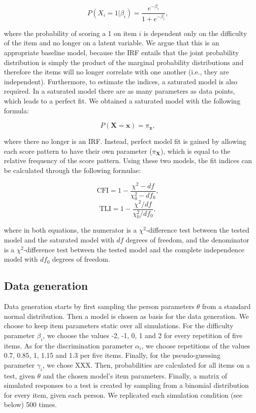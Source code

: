 \documentclass[Royal,sageapa,times,doublespace]{sagej}
\begin{document}
\begin{equation}
P(X_i = 1 | \beta_{i}) = \frac{e^{- \beta_{i}}}{1 + e^{- \beta_{i}}},
\end{equation}

where the probability of scoring a 1 on item $i$ is dependent only on the difficulty of the item and no longer on a latent variable. We argue that this is an appropriate baseline model, because the IRF entails that the joint probability distribution is simply the product of the marginal probability distributions and therefore the items will no longer correlate with one another (i.e., they are independent). Furthermore, to estimate the indices, a saturated model is also required. In a saturated model there are as many parameters as data points, which leads to a perfect fit. We obtained a saturated model with the following formula:

\begin{equation}
P(\boldsymbol{X} = \boldsymbol{x}) = \pi_{\boldsymbol{x}},
\end{equation}

where there no longer is an IRF. Instead, perfect model fit is gained by allowing each score pattern to have their own parameter ($\pi_{\boldsymbol{X}}$), which is equal to the relative frequency of the score pattern. Using these two models, the fit indices can be calculated through the following formulae:

\begin{equation}
\text{CFI} = 1 - \frac{\chi^{2} - df}{\chi^{2}_{0} - df_0},
\end{equation}
\begin{equation}
\text{TLI} = 1 - \frac{\chi^{2}/df}{\chi^{2}_{0}/df_0},
\end{equation}

where in both equations, the numerator is a $\chi^2$-difference test between the tested model and the saturated model with $df$ degrees of freedom, and the denominator is a $\chi^2$-difference test between the tested model and the complete independence model with $df_0$ degrees of freedom.

\subsection{Data generation}
Data generation starts by first sampling the person parameters $\theta$ from a standard normal distribution. Then a model is chosen as basis for the data generation. We choose to keep item parameters static over all simulations. For the difficulty parameter $\beta_i$, we choose the values -2, -1, 0, 1 and 2 for every repetition of five items. As for the discrimination parameter $\alpha_i$, we choose repetitions of the values 0.7, 0.85, 1, 1.15 and 1.3 per five items. Finally, for the pseudo-guessing parameter $\gamma_i$, we chose XXX. Then, probabilities are calculated for all items on a test, given $\theta$ and the chosen model's item parameters. Finally, a matrix of simulated responses to a test is created by sampling from a binomial distribution for every item, given each person. We replicated each simulation condition (see below) 500 times.
\end{document}
